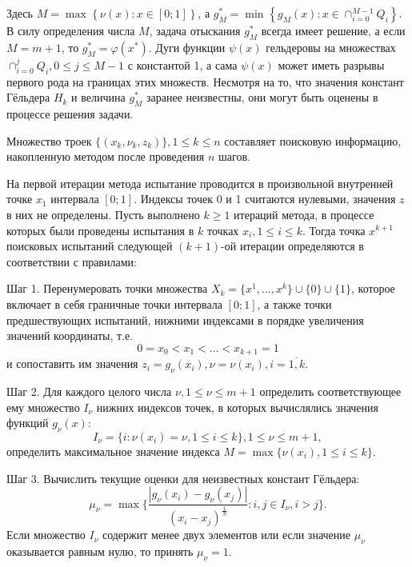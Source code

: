 Здесь \(M=\max_{}^{}\left\{\nu (x):x\in [0;1]\right\}\), а \(g_{M}^{*}=\min _{}^{}\left\{g_{M}(x):x\in \cap _{i=0}^{M-1}Q_{i}\right\}\).
В силу определения числа \(M\), задача отыскания \(g_{M}^{*}\)
всегда имеет решение, а если \(M=m+1\), то \(g_{M}^{*}=\varphi(x^{*})\).
Дуги функции \(\psi (x)\) гельдеровы на множествах \(\cap _{i=0}^{j}Q_{i},0\leq j\leq M-1\)
с константой 1, а сама \(\psi (x)\) может иметь разрывы первого рода на границах этих множеств.
Несмотря на то, что значения констант Гёльдера \(H_k\) и величина \(g_{M}^{*}\) заранее неизвестны,
они могут быть оценены в процессе решения задачи.

Множество троек \(\{(x_k,\nu_k,z_k)\}, 1\leqslant k\leqslant n\) составляет поисковую информацию,
накопленную методом после проведения \(n\) шагов.

На первой итерации метода испытание проводится в произвольной внутренней точке \(x_1\)
интервала \([0;1]\). Индексы точек 0 и 1 считаются нулевыми, значения \(z\) в
них не определены. Пусть выполнено \(k\geqslant 1\) итераций метода,
в процессе которых были проведены испытания в \(k\) точках \(x_i, 1\leqslant i\leqslant k\).
Тогда точка \(x^{k+1}\) поисковых испытаний следующей \((k+1)\)-ой
итерации определяются в соответствии с правилами:

Шаг 1. Перенумеровать точки множества \(X_k=\{x^1,\dotsc,x^k\}\cup\{0\}\cup\{1\}\),
которое включает в себя граничные точки интервала \([0;1]\), а также точки предшествующих
испытаний, нижними индексами в порядке увеличения значений координаты, т.е.
\begin{equation}
  \label{eq:points}
0=x_0<x_1<\dotsc<x_{k+1}=1
\end{equation}
и сопоставить им значения \(z_{i}=g_{\nu }(x_{i}),\nu =\nu (x_{i}),i={\overline {1,k}}\).

Шаг 2. Для каждого целого числа \(\nu ,1\leqslant \nu \leqslant m+1\) определить соответствующее
ему множество \(I_{\nu }\) нижних индексов точек, в которых вычислялись значения
функций \(g_{\nu }(x)\):
\begin{displaymath}
  I_{\nu }=\{i:\nu (x_{i})=\nu ,1\leqslant i\leqslant k\},1\leq \nu \leqslant m+1,
\end{displaymath}
определить максимальное значение индекса \(M=\max\{\nu (x_{i}),1\leq i\leq k\}\).

Шаг 3. Вычислить текущие оценки для неизвестных констант Гёльдера:
\begin{equation}
  \label{eq:step2}
  \mu _{\nu }=\max\{\frac{|g_{\nu }(x_{i})-g_{\nu }(x_{j})|}{(x_{i}-x_{j})^{\frac{1}{N}}}:i,j\in I_{\nu },i>j\}.
\end{equation}
Если множество \(I_{\nu }\) содержит менее двух элементов или если значение \(\mu _{\nu }\)
оказывается равным нулю, то принять \(\mu _{\nu }=1\).

